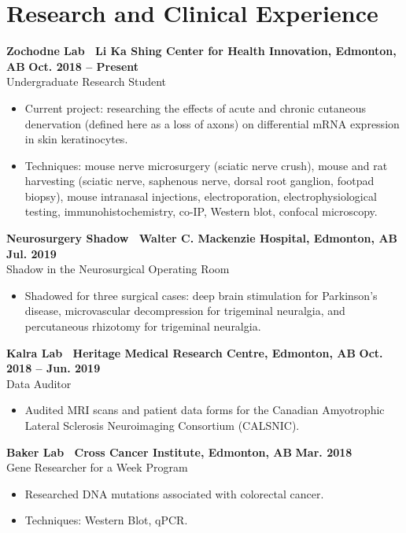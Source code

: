 \documentclass{article}
\begin{document}
\section*{Research and Clinical Experience}
    \textbf{Zochodne Lab \textbar\ Li Ka Shing Center for Health Innovation, Edmonton, AB} \hfill \textbf{Oct. 2018 -- Present}\\
    Undergraduate Research Student
    \begin{itemize}
        \item Current project: researching the effects of acute and chronic cutaneous denervation (defined here as a loss of axons) on differential mRNA expression in skin keratinocytes.
        \item Techniques: mouse nerve microsurgery (sciatic nerve crush), mouse and rat harvesting (sciatic nerve, saphenous nerve, dorsal root ganglion, footpad biopsy), mouse intranasal injections, electroporation, electrophysiological testing, immunohistochemistry, co-IP, Western blot, confocal microscopy.
    \end{itemize}

    \textbf{Neurosurgery Shadow \textbar\ Walter C. Mackenzie Hospital, Edmonton, AB} \hfill \textbf{Jul. 2019}\\
    Shadow in the Neurosurgical Operating Room
    \begin{itemize}
        \item Shadowed for three surgical cases: deep brain stimulation for Parkinson's disease, microvascular decompression for trigeminal neuralgia, and percutaneous rhizotomy for trigeminal neuralgia.
    \end{itemize}

    \textbf{Kalra Lab \textbar\ Heritage Medical Research Centre, Edmonton, AB} \hfill  \textbf{Oct. 2018 -- Jun. 2019}\\
    Data Auditor
    \begin{itemize}
        \item Audited MRI scans and patient data forms for the Canadian Amyotrophic Lateral Sclerosis Neuroimaging Consortium (CALSNIC).
    \end{itemize}

    \textbf{Baker Lab \textbar\ Cross Cancer Institute, Edmonton, AB} \hfill \textbf{Mar. 2018}\\
    Gene Researcher for a Week Program
    \begin{itemize}
        \item Researched DNA mutations associated with colorectal cancer.
        \item Techniques: Western Blot, qPCR.
    \end{itemize}
\end{document}
